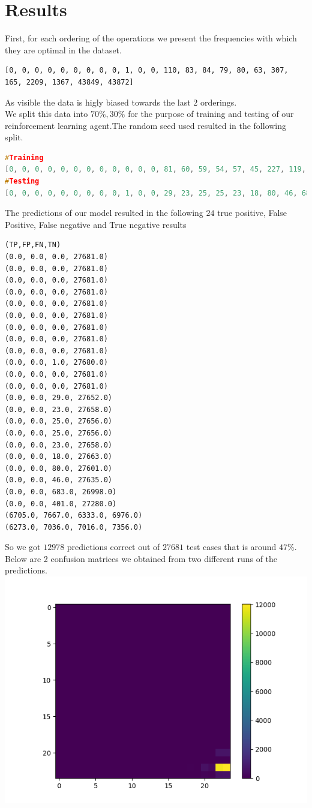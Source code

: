 \section{Results}
First, for each ordering of the operations we present the frequencies with which they are optimal in the dataset.
\begin{lstlisting}
[0, 0, 0, 0, 0, 0, 0, 0, 0, 1, 0, 0, 110, 83, 84, 79, 80, 63, 307, 165, 2209, 1367, 43849, 43872]
\end{lstlisting} 
As visible the data is higly biased towards the last $2$ orderings.\\
We split this data into $70\%,30\%$ for the purpose of training and testing of our reinforcement learning agent.The random seed used resulted in the following split.
\begin{lstlisting}[language=C++]
#Training
[0, 0, 0, 0, 0, 0, 0, 0, 0, 0, 0, 0, 81, 60, 59, 54, 57, 45, 227, 119, 1526, 966, 30811, 30583]
#Testing
[0, 0, 0, 0, 0, 0, 0, 0, 0, 1, 0, 0, 29, 23, 25, 25, 23, 18, 80, 46, 683, 401, 13038, 13289]
\end{lstlisting}
The predictions of our model resulted in the following $24$ true positive, False Positive, False negative and True negative results\\
\begin{lstlisting}
(TP,FP,FN,TN)
(0.0, 0.0, 0.0, 27681.0)
(0.0, 0.0, 0.0, 27681.0)
(0.0, 0.0, 0.0, 27681.0)
(0.0, 0.0, 0.0, 27681.0)
(0.0, 0.0, 0.0, 27681.0)
(0.0, 0.0, 0.0, 27681.0)
(0.0, 0.0, 0.0, 27681.0)
(0.0, 0.0, 0.0, 27681.0)
(0.0, 0.0, 0.0, 27681.0)
(0.0, 0.0, 1.0, 27680.0)
(0.0, 0.0, 0.0, 27681.0)
(0.0, 0.0, 0.0, 27681.0)
(0.0, 0.0, 29.0, 27652.0)
(0.0, 0.0, 23.0, 27658.0)
(0.0, 0.0, 25.0, 27656.0)
(0.0, 0.0, 25.0, 27656.0)
(0.0, 0.0, 23.0, 27658.0)
(0.0, 0.0, 18.0, 27663.0)
(0.0, 0.0, 80.0, 27601.0)
(0.0, 0.0, 46.0, 27635.0)
(0.0, 0.0, 683.0, 26998.0)
(0.0, 0.0, 401.0, 27280.0)
(6705.0, 7667.0, 6333.0, 6976.0)
(6273.0, 7036.0, 7016.0, 7356.0)
\end{lstlisting}
So we got $12978$ predictions correct out of $27681$ test cases that is around $47\%$.
Below are 2 confusion matrices we obtained from two different runs of the predictions.\\
\includegraphics{cm2.png}\\
